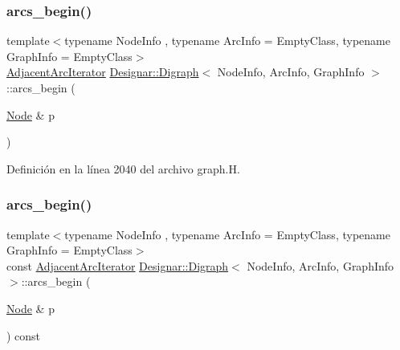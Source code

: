 \subsubsection{\texorpdfstring{arcs\+\_\+begin()}{arcs\_begin()}\hspace{0.1cm}{\footnotesize\ttfamily [3/4]}}
{\footnotesize\ttfamily template$<$typename Node\+Info , typename Arc\+Info  = Empty\+Class, typename Graph\+Info  = Empty\+Class$>$ \\
\hyperlink{class_designar_1_1_digraph_1_1_adjacent_arc_iterator}{Adjacent\+Arc\+Iterator} \hyperlink{class_designar_1_1_digraph}{Designar\+::\+Digraph}$<$ Node\+Info, Arc\+Info, Graph\+Info $>$\+::arcs\+\_\+begin (\begin{DoxyParamCaption}\item[{\hyperlink{class_designar_1_1_digraph_a4dc921c41a480b7946a04170e997d8ae}{Node} \&}]{p }\end{DoxyParamCaption})\hspace{0.3cm}{\ttfamily [inline]}}



Definición en la línea 2040 del archivo graph.\+H.

\mbox{\label{class_designar_1_1_digraph_aa17a29b3ea956a3ad98e991fb13d0a20}} 
\subsubsection{\texorpdfstring{arcs\+\_\+begin()}{arcs\_begin()}\hspace{0.1cm}{\footnotesize\ttfamily [4/4]}}
{\footnotesize\ttfamily template$<$typename Node\+Info , typename Arc\+Info  = Empty\+Class, typename Graph\+Info  = Empty\+Class$>$ \\
const \hyperlink{class_designar_1_1_digraph_1_1_adjacent_arc_iterator}{Adjacent\+Arc\+Iterator} \hyperlink{class_designar_1_1_digraph}{Designar\+::\+Digraph}$<$ Node\+Info, Arc\+Info, Graph\+Info $>$\+::arcs\+\_\+begin (\begin{DoxyParamCaption}\item[{\hyperlink{class_designar_1_1_digraph_a4dc921c41a480b7946a04170e997d8ae}{Node} \&}]{p }\end{DoxyParamCaption}) const\hspace{0.3cm}{\ttfamily [inline]}}



